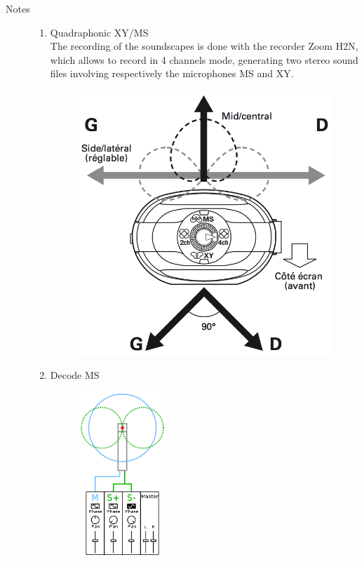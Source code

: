 \begin{description}
\item[Notes] \hfill 
\begin{enumerate}
\item Quadraphonic XY/MS\\
The recording of the soundscapes is done with the recorder Zoom H2N, which allows to record in 4 channels mode, generating two stereo sound files involving respectively the microphones MS and XY.
 \begin{figure}[H]
\begin{center}
\includegraphics[scale=0.23]{mp/img/H2N.png}
\end{center}
\end{figure}
\item Decode MS\\
\begin{figure}[!hbt]
	\begin{center}
		\includegraphics[width=33mm]{mp/img/MS}

\end{center}
\end{figure}
\end{enumerate}
\end{description}
